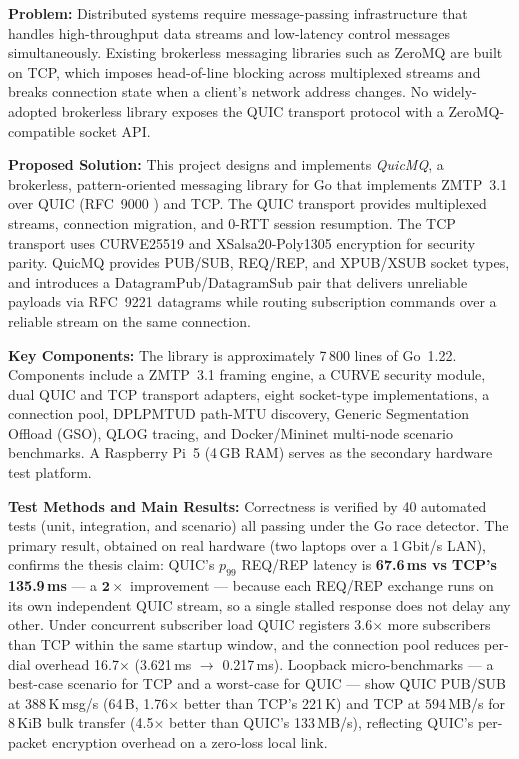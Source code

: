 \documentclass[12pt, a4paper, oneside]{report}
\begin{document}
\noindent\textbf{Problem:}
Distributed systems require message-passing infrastructure that handles high-throughput data streams and low-latency control messages simultaneously. Existing brokerless messaging libraries such as ZeroMQ are built on TCP, which imposes head-of-line blocking across multiplexed streams and breaks connection state when a client's network address changes. No widely-adopted brokerless library exposes the QUIC transport protocol with a ZeroMQ-compatible socket API.

\noindent\textbf{Proposed Solution:}
This project designs and implements \textit{QuicMQ}, a brokerless, pattern-oriented messaging library for Go that implements ZMTP~3.1 \cite{zmq} over QUIC (RFC~9000 \cite{rfc9000}) and TCP. The QUIC transport provides multiplexed streams, connection migration, and 0-RTT session resumption. The TCP transport uses CURVE25519 and XSalsa20-Poly1305 encryption for security parity. QuicMQ provides PUB/SUB, REQ/REP, and XPUB/XSUB socket types, and introduces a DatagramPub/DatagramSub pair that delivers unreliable payloads via RFC~9221 \cite{rfc9221} datagrams while routing subscription commands over a reliable stream on the same connection.

\noindent\textbf{Key Components:}
The library is approximately 7\,800 lines of Go~1.22. Components include a ZMTP~3.1 framing engine, a CURVE security module, dual QUIC and TCP transport adapters, eight socket-type implementations, a connection pool, DPLPMTUD path-MTU discovery, Generic Segmentation Offload (GSO), QLOG tracing, and Docker/Mininet multi-node scenario benchmarks. A Raspberry Pi~5 (4\,GB RAM) serves as the secondary hardware test platform.

\noindent\textbf{Test Methods and Main Results:}
Correctness is verified by 40 automated tests (unit, integration, and scenario) all passing under the Go race detector.
The primary result, obtained on real hardware (two laptops over a 1\,Gbit/s LAN), confirms the thesis claim:
QUIC's $p_{99}$ REQ/REP latency is \textbf{67.6\,ms vs TCP's 135.9\,ms} — a $\mathbf{2{\times}}$ improvement — because each REQ/REP exchange runs on its own independent QUIC stream, so a single stalled response does not delay any other.
Under concurrent subscriber load QUIC registers 3.6$\times$ more subscribers than TCP within the same startup window, and the connection pool reduces per-dial overhead 16.7$\times$ (3.621\,ms $\to$ 0.217\,ms).
Loopback micro-benchmarks — a best-case scenario for TCP and a worst-case for QUIC — show QUIC PUB/SUB at 388\,K\,msg/s (64\,B, 1.76$\times$ better than TCP's 221\,K) and TCP at 594\,MB/s for 8\,KiB bulk transfer (4.5$\times$ better than QUIC's 133\,MB/s), reflecting QUIC's per-packet encryption overhead on a zero-loss local link.
\end{document}
